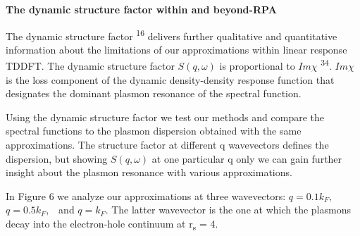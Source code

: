 \documentclass[12pt]{article}
\renewcommand{\_}{\kern-1.5pt\textunderscore\kern-1.5pt}
\begin{document}
\vspace{\baselineskip}
\setlength{\parskip}{9.96pt}

\vspace{\baselineskip}
\setlength{\parskip}{0.0pt}
\setlength{\parskip}{9.96pt}
\setlength{\parskip}{0.0pt}
\begin{justify}
\textbf{The dynamic structure factor within and beyond-RPA}
\end{justify}\par


\vspace{\baselineskip}
\setlength{\parskip}{9.96pt}
\setlength{\parskip}{0.0pt}
\begin{justify}
The dynamic structure factor \textsuperscript{16} delivers further qualitative and quantitative information about the limitations of our approximations within linear response TDDFT. The dynamic structure factor  \( S \left( q, \omega  \right)  \)  is proportional to  \( Im  \chi  \)  \textsuperscript{34}.  \( Im  \chi  \)  is the loss component of the dynamic density-density response function that designates the dominant plasmon resonance of the spectral function.
\end{justify}\par

\begin{justify}
Using the dynamic structure factor we test our methods and compare the spectral functions to the plasmon dispersion obtained with the same approximations. The structure factor at different q wavevectors defines the dispersion, but showing  \( S \left( q, \omega  \right)  \)  at one particular q only we can gain further insight about the plasmon resonance with various approximations.
\end{justify}\par

\begin{justify}
In Figure 6 we analyze our approximations at three wavevectors:  \( q=0.1k_{F}, \)   \( q=0.5k_{F}, \) \  and  \( q=k_{F}. \)  The latter wavevector is the one at which the plasmons decay into the electron-hole continuum at r\textsubscript{s} = 4.
\end{justify}\par
\end{document}
